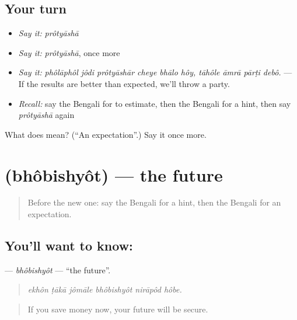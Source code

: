 \subsection*{Your turn}
\begin{itemize}
\raggedright
  \item \emph{Say it:} \emph{prôtyāshā}
  \item \emph{Say it:} \emph{prôtyāshā}, once more
  \item \emph{Say it:} \emph{phôlāphôl jôdi prôtyāshār cheye bhālo hôy, tāhôle āmrā pārṭi debô.} — If the results are better than expected, we'll throw a party.
  \item \emph{Recall:} say the Bengali for to estimate, then the Bengali for a hint, then say \emph{prôtyāshā} again
\end{itemize}

\begin{tcolorbox}[breakable,colback=teal!4,colframe=teal!35!black,title={Before you move on}]
What does  mean? (\textquotedblleft{}An expectation\textquotedblright{}.) Say it once more.
\end{tcolorbox}
\section[\texorpdfstring{\bn{ভবিষ্যৎ} (bhôbishyôt)}{ভবিষ্যৎ (bhôbishyôt)}]{ (bhôbishyôt) — the future}

\label{lesson:BN-C367-bhobishyot}



\begin{quote}
Before the new one: say the Bengali for a hint, then the Bengali for an expectation.
\end{quote}

\subsection*{You'll want to know: }
\textbf{} — \emph{bhôbishyôt} — \textquotedblleft{}the future\textquotedblright{}.

\begin{quote}
     
\end{quote}

\begin{quote}
\emph{ekhôn ṭākā jômāle bhôbishyôt nirāpôd hôbe.}
\end{quote}

\begin{quote}
If you save money now, your future will be secure.
\end{quote}

